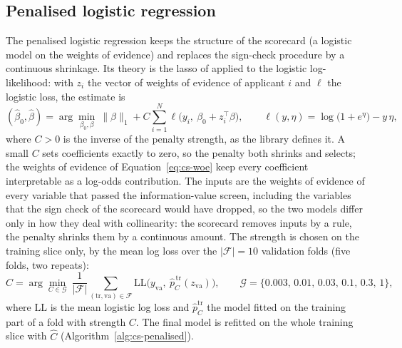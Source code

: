 \subsection{Penalised logistic regression}
\label{sec:m2}

The penalised logistic regression keeps the structure of the scorecard (a logistic model on the weights of evidence) and replaces
the sign-check procedure by a continuous shrinkage. Its theory is the lasso of \citet{credit-scoring:tibshirani1996} applied to the
logistic log-likelihood: with $z_i$ the vector of weights of evidence of applicant $i$ and $\ell$ the logistic loss, the estimate is
\begin{equation}
(\hat\beta_0,\hat\beta)=\arg\min_{\beta_0,\beta}\ \|\beta\|_1+C\sum_{i=1}^{N}\ell\big(y_i,\ \beta_0+z_i^{\top}\beta\big),\qquad
\ell(y,\eta)=\log\!\big(1+e^{\eta}\big)-y\,\eta,
\label{eq:cs-l1}
\end{equation}
where $C>0$ is the inverse of the penalty strength, as the library defines it. A small $C$ sets coefficients exactly to zero, so
the penalty both shrinks and selects; the weights of evidence of Equation~\eqref{eq:cs-woe} keep every coefficient interpretable
as a log-odds contribution. The inputs are the weights of evidence of every variable that passed the information-value screen,
including the variables that the sign check of the scorecard would have dropped, so the two models differ only in how they deal
with collinearity: the scorecard removes inputs by a rule, the penalty shrinks them by a continuous amount. The strength is chosen
on the training slice only, by the mean log loss over the $|\mathcal{F}|=10$ validation folds (five folds, two repeats):
\begin{equation}
\hat C=\arg\min_{C\in\mathcal{G}}\ \frac{1}{|\mathcal{F}|}\sum_{(\mathrm{tr},\mathrm{va})\in\mathcal{F}}
\mathrm{LL}\big(y_{\mathrm{va}},\ \hat p_{C}^{\,\mathrm{tr}}(z_{\mathrm{va}})\big),\qquad
\mathcal{G}=\{0.003,\,0.01,\,0.03,\,0.1,\,0.3,\,1\},
\label{eq:cs-cv}
\end{equation}
where $\mathrm{LL}$ is the mean logistic log loss and $\hat p_C^{\mathrm{tr}}$ the model fitted on the training part of a fold with
strength $C$. The final model is refitted on the whole training slice with $\hat C$ (Algorithm~\ref{alg:cs-penalised}).

